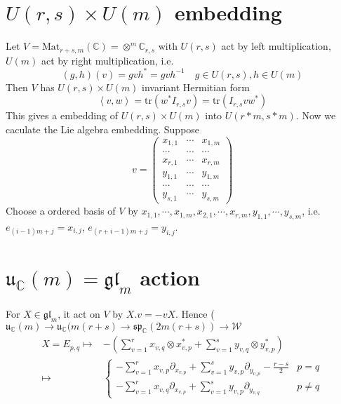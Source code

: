 \documentclass[12pt]{article}
\def\Mat{{\rm Mat}}
\def\bC{{\mathbb{C}}}
\def\sp{{\mathfrak{sp}}}
\def\inn#1#2{\left\langle{#1},{#2}\right\rangle}
\def\agl{\mathfrak{gl}}
\def\lww{\mathcal{W}}
\def\fuu{\mathfrak{u}}
\def\tr{\mathrm{tr}}
\def\Mat{\mathrm{Mat}}
\begin{document}
\section{$U(r,s)\times U(m)$ embedding}
Let $V = \Mat_{r+s,m}(\bC) = \otimes^m \bC_{r,s}$ with $U(r,s)$ act by left multiplication, $U(m)$ 
act by right multiplication, i.e. 
\[
(g,h)(v) = gvh^* = gvh^{-1} \quad g\in U(r,s), h\in U(m)
\]
Then $V$ has $U(r,s)\times U(m)$ invariant Hermitian form 
\[
\inn{v}{w} =  \tr(w^*I_{r,s}v) = \tr(I_{r,s} vw^*)
\]
This gives a embedding of $U(r,s)\times U(m)$ into $U(r*m, s*m)$. 
Now we caculate the Lie algebra embedding.
Suppose 
\[
v=\begin{pmatrix}
x_{1,1} & \cdots & x_{1,m}\\
\cdots & \cdots & \cdots \\
x_{r,1} & \cdots & x_{r,m}\\
y_{1,1}& \cdots & y_{1,m} \\
\cdots & \cdots & \cdots\\
y_{s,1} & \cdots & y_{s,m}
\end{pmatrix}
\]
Choose a ordered basis of $V$ by $x_{1,1}, \cdots, x_{1,m}, x_{2,1}, \cdots, x_{r,m}, y_{1,1},
\cdots, y_{s,m}$, i.e. $e_{(i-1)m+j}=x_{i,j}$, $e_{(r+i-1)m+j}=y_{i,j}$. 

\section{$\fuu_\bC(m) = \agl_m$ action}
For $X \in \agl_m$, it act on $V$ by $X.v = -vX$.
Hence ($\fuu_\bC(m) \to \fuu_\bC(m(r+s) \to \sp_\bC(2m(r+s))\to \lww$
\[
\begin{split}
X = E_{p,q}\mapsto& -(\sum_{v=1}^r x_{v,q}\otimes x_{v,p}^*
+ \sum_{v=1}^s y_{v,q}\otimes y_{v,p}^*)\\
\mapsto& \begin{cases}
-\sum_{v=1}^r x_{v,p} \partial_{x_{v,p}} +
\sum_{v=1}^s y_{v,p} \partial_{y_{v,p}}
- \frac{r-s}{2} & p=q\\
-\sum_{v=1}^r x_{v,q}\partial_{x_{v,p}}
+\sum_{v=1}^s y_{v,p}\partial_{y_{v,q}}
& p\neq q
\end{cases}
\end{split}
\]
\end{document}
